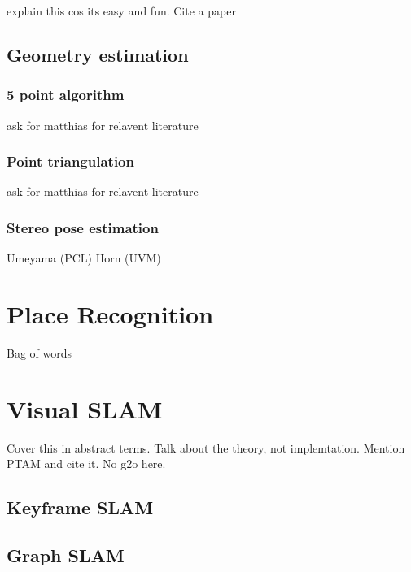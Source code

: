 explain this cos its easy and fun.  Cite a paper

\subsection{Geometry estimation}

\subsubsection{5 point algorithm}

ask for matthias for relavent literature

\subsubsection{Point triangulation}

ask for matthias for relavent literature

\subsubsection{Stereo pose estimation}

Umeyama (PCL) \newline 
Horn (UVM)


\section{Place Recognition}

Bag of words

\section{Visual SLAM}

Cover this in abstract terms.  Talk about the theory, not implemtation.  Mention PTAM and cite it.
No g2o here.

\subsection{Keyframe SLAM}

\subsection{Graph SLAM}
